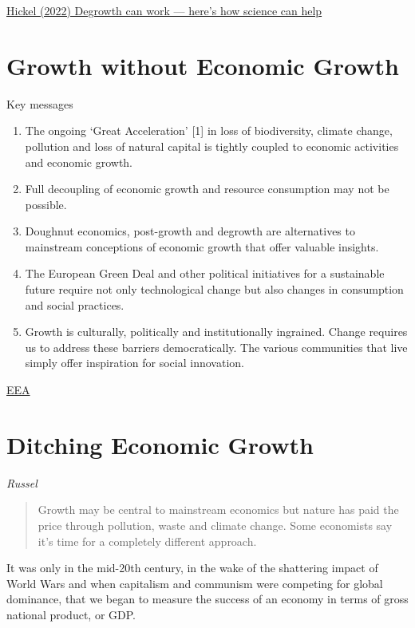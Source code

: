 \documentclass[
]{book}
\providecommand{\tightlist}{%
  \setlength{\itemsep}{0pt}\setlength{\parskip}{0pt}}
\begin{document}
\href{https://www.nature.com/articles/d41586-022-04412-x}{Hickel (2022) Degrowth can work --- here's how science can help}

\hypertarget{growth-without-economic-growth}{%
\section{Growth without Economic Growth}\label{growth-without-economic-growth}}

Key messages

\begin{enumerate}
\def\labelenumi{\arabic{enumi}.}
\tightlist
\item
  The ongoing `Great Acceleration' {[}1{]} in loss of biodiversity, climate change, pollution and loss of natural capital is tightly coupled to economic activities and economic growth.
\item
  Full decoupling of economic growth and resource consumption may not be possible.
\item
  Doughnut economics, post-growth and degrowth are alternatives to mainstream conceptions of economic growth that offer valuable insights.
\item
  The European Green Deal and other political initiatives for a sustainable future require not only technological change but also changes in consumption and social practices.
\item
  Growth is culturally, politically and institutionally ingrained. Change requires us to address these barriers democratically. The various communities that live simply offer inspiration for social innovation.
\end{enumerate}

\href{https://www.eea.europa.eu/publications/growth-without-economic-growth}{EEA}

\hypertarget{ditching-economic-growth}{%
\section{Ditching Economic Growth}\label{ditching-economic-growth}}

\emph{Russel}

\begin{quote}
Growth may be central to mainstream economics but nature has paid the price through pollution, waste and climate change. Some economists say it's time for a completely different approach.
\end{quote}

It was only in the mid-20th century, in the wake of the shattering impact of World Wars and when capitalism and communism were competing for global dominance, that we began to measure the success of an economy in terms of gross national product, or GDP.
\end{document}
